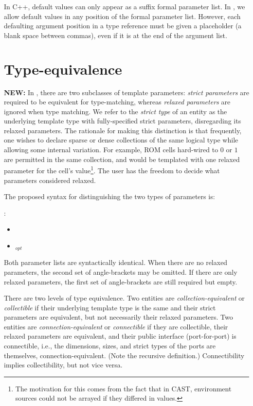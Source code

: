 In C++, default values can only appear as a suffix formal parameter list.  
In \hac, we allow default values in any position of the formal 
parameter list.  
However, each defaulting argument position in a type reference
must be given a placeholder (a blank space between commas), 
even if it is at the end of the argument list.  


\section{Type-equivalence}
\label{sec:templates:equivalence}

\textbf{NEW:}
In \hac, there are two subclasses of template parameters:
\emph{strict parameters} are required to be equivalent for type-matching,
whereas \emph{relaxed parameters} are ignored when type matching.  
We refer to the \emph{strict type} of an entity as the 
underlying template type with fully-specified strict parameters, 
disregarding its relaxed parameters.  
The rationale for making this distinction is that frequently, 
one wishes to declare sparse or dense collections of the same 
logical type while allowing some internal variation.  
For example, ROM cells hard-wired to $0$ or $1$ are permitted
in the same collection, and would be templated with one relaxed 
parameter for the cell's value\footnote{
The motivation for this comes from the fact that in CAST, 
environment sources could not be arrayed if they differed in values.}.
The user has the freedom to decide what parameters considered relaxed.  

The proposed syntax for distinguishing the two types of parameters is:

\medskip
\noindent
{}:
\begin{itemize}
\item {} \ttt{<}  \ttt{>}
\item {} \ttt{<} $_{opt}$ \ttt{>}
	\ttt{<}  \ttt{>}
\end{itemize}
Both parameter lists are syntactically identical.  
When there are no relaxed parameters, the second set of angle-brackets
may be omitted.  
If there are only relaxed parameters, the first set of angle-brackets
are still required but empty.  


There are two levels of type equivalence.  
Two entities are \emph{collection-equivalent} or \emph{collectible}
if their underlying template type is the same and their 
strict parameters are equivalent, 
but not necessarily their relaxed parameters.  
Two entities are \emph{connection-equivalent} or \emph{connectible}
if they are collectible, their relaxed parameters are equivalent, 
and their public interface (port-for-port) is connectible, i.e., 
the dimensions, sizes, and strict types of the ports are themselves, 
connection-equivalent.  
(Note the recursive definition.)
Connectibility implies collectibility, but not vice versa.  

